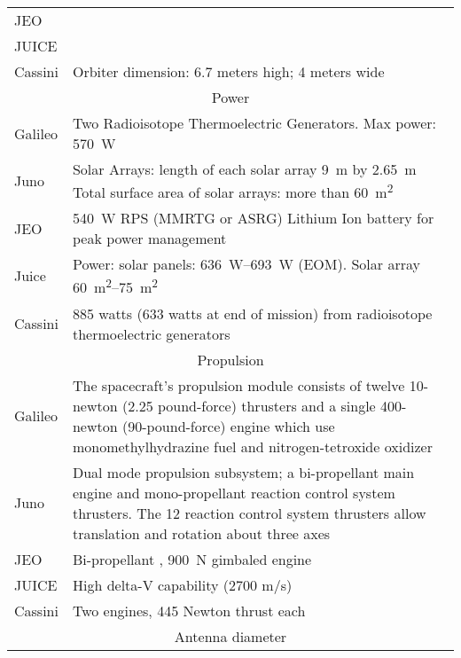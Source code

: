 \begin{longtable}{lp{}}
  JEO & \\

  JUICE & \\

  Cassini & Orbiter dimension: 6.7 meters high; 4 meters wide \\

  \multicolumn{2}{c}{Power} \\ \midrule

  Galileo & Two Radio\-isotope Thermoelectric Generators. Max power:
  \SI{570}{W} \\

  Juno & Solar Arrays: length of each solar array \SI{9}{m} by
  \SI{2.65}{m} Total surface area of solar arrays: more than
  \SI{60}{m^2} \\

  JEO & \SI{540}{W} RPS (MMRTG or ASRG) Lithium Ion battery for peak
  power management \\

  Juice & Power: solar panels: \SI{636}{W}--\SI{693}{W} (EOM). Solar array
  \SI{60}{m^2}--\SI{75}{m^2} \\

  Cassini & 885 watts (633 watts at end of mission) from radioisotope
  thermoelectric generators \\

  \multicolumn{2}{c}{Propulsion} \\ \midrule

  Galileo & The spacecraft's propulsion module consists of twelve
  10-newton (2.25 pound\--force) thrusters and a single 400-newton
  (90-pound-force) engine which use monomethylhydrazine fuel and
  nitrogen-tetroxide oxidizer \\

  Juno & Dual mode propulsion subsystem; a bi-propellant main engine and
  mono-propellant reaction control system thrusters. The 12 reaction
  control system thrusters allow translation and rotation about three
  axes \\

  JEO & Bi-propellant , \SI{900}{N} gimbaled engine \\

  JUICE & High delta-V capability (2700 m/s) \\

  Cassini & Two engines, 445 Newton thrust each \\

  \multicolumn{2}{c}{Antenna diameter} \\ \midrule


\end{longtable}
